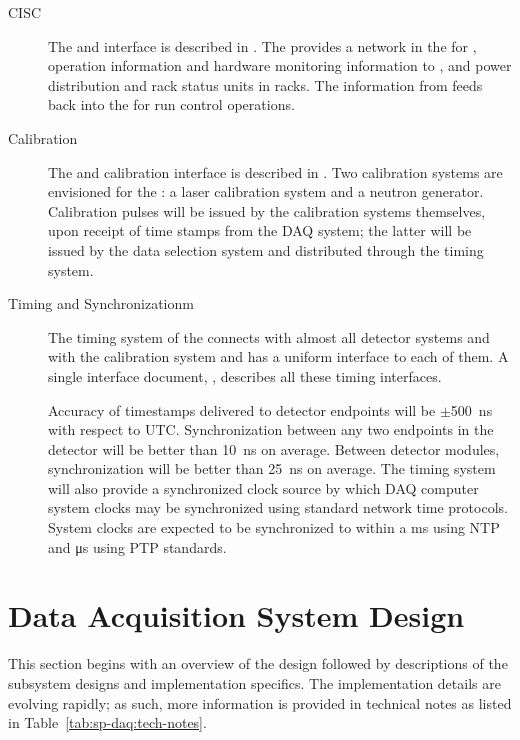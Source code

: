 \begin{description}
\item[CISC] The  and  interface is described in
. The  provides a network in the  for ,  operation information and hardware
monitoring information to , and power distribution and
rack status units in  racks. The information from 
feeds back into the  for run control operations.

\item[Calibration] The  and calibration interface is described in
. Two calibration systems are envisioned for the
: a laser calibration system and a neutron
generator. Calibration pulses will be issued by the calibration
systems themselves, upon receipt of time stamps from the DAQ system;  %
the latter will be issued by the data selection system and distributed through the
 timing system.


\item[Timing and Synchronizationm] The timing system of the
    connects with 
almost all detector systems and with the calibration system and has a uniform interface to each of
them. 
A single interface document,
, describes all these timing interfaces. 

Accuracy of timestamps delivered to  detector endpoints will be $\pm$\SI{500}{\nano\second} with respect to UTC.  Synchronization between any two endpoints in the detector will be better than \SI{10}{\nano\second} on average.   Between detector modules, synchronization will be better than \SI{25}{\nano\second} on average.  The timing system will also provide a synchronized clock source by which DAQ computer system clocks may be synchronized using standard network time protocols.  System clocks are expected to be synchronized to within a \si{\milli\second} using NTP and \si{\micro\second} using PTP standards. 
\end{description}

\section{Data Acquisition System Design}
\label{sec:fd-daq:design}

This section begins with an overview of the 
design followed by %
descriptions of the subsystem designs and implementation specifics. The
implementation details are evolving rapidly; as such, more information
is provided in technical notes as listed in Table~\ref{tab:sp-daq:tech-notes}. 

